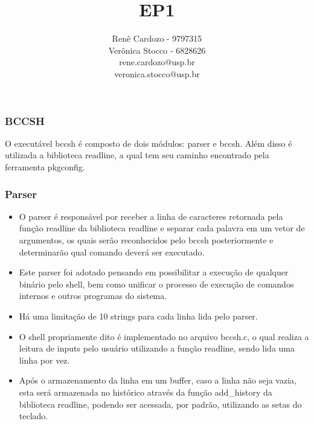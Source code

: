 \documentclass{beamer}
\author{Renê Cardozo - 9797315 \\ 
        Verônica Stocco - 6828626 \\
        rene.cardozo@usp.br \\
        veronica.stocco@usp.br}
\title{EP1}
\institute{Instituto de Matemática e Estatística \\
Universidade de São Paulo}
\date{}
\begin{document}
\frame{\titlepage}

\begin{frame}

\frametitle{BCCSH}

O executável bccsh é composto de dois módulos: parser e bccsh. Além disso é utilizada a biblioteca readline, a qual tem
seu caminho encontrado pela ferramenta pkgconfig.

\end{frame}

\begin{frame}
\frametitle{Parser}

\begin{itemize}
\item O parser é responsável por receber a linha de caracteres retornada pela função readline da biblioteca readline e separar cada palavra em um vetor de argumentos, os quais serão reconhecidos pelo bccsh posteriormente e determinarão qual comando deverá ser executado.  

\item Este parser foi adotado pensando em possibilitar a execução de qualquer binário pelo shell, bem como unificar o processo de execução de comandos internos e outros programas do sistema.  


\item Há uma limitação de 10 strings para cada linha lida pelo parser.

\end{itemize}
\end{frame}

\begin{frame}

\begin{itemize}
\frametitle{Shell}
\item O shell propriamente dito é implementado no arquivo bccsh.c, o qual realiza a leitura de inputs pelo usuário utilizando
a função readline, sendo lida uma linha por vez. 

\item Após o armazenamento da linha em um buffer, caso a linha não seja
vazia, esta será armazenada no histórico através da função add\_history da biblioteca readline, podendo ser acessada,
por padrão, utilizando as setas do teclado.

\end{itemize}
\end{frame}
\end{document}
